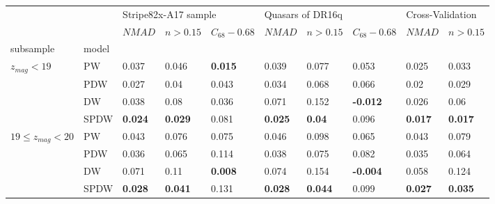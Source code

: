 \documentclass[fleqn,usenatbib]{mnras}
\begin{document}
\begin{table}
	\begin{tabular}{llllllllll}
            \hline
                                   &      & \multicolumn{3}{l}{Stripe82x-A17 sample} & \multicolumn{3}{l}{Quasars of DR16q} & \multicolumn{2}{l}{Cross-Validation} \\
                                   &      &               $NMAD$ &        $n>0.15$ &  $C_{68} - 0.68$ &           $NMAD$ &        $n>0.15$ &  $C_{68} - 0.68$ &           $NMAD$ &        $n>0.15$ \\
            subsample & model &                      &                 &                  &                  &                 &                  &                  &                 \\
            \hline
\hline
            $z_{mag} < 19$ & PW &                0.037 &           0.046 &   \textbf{0.015} &            0.039 &           0.077 &            0.053 &            0.025 &           0.033 \\
                                   & PDW &                0.027 &            0.04 &            0.043 &            0.034 &           0.068 &            0.066 &             0.02 &           0.029 \\
                                   & DW &                0.038 &            0.08 &            0.036 &            0.071 &           0.152 &  \textbf{-0.012} &            0.026 &            0.06 \\
                                   & SPDW &       \textbf{0.024} &  \textbf{0.029} &            0.081 &   \textbf{0.025} &   \textbf{0.04} &            0.096 &   \textbf{0.017} &  \textbf{0.017} \\
\hline
            $19 \leq z_{mag} < 20$ & PW &                0.043 &           0.076 &            0.075 &            0.046 &           0.098 &            0.065 &            0.043 &           0.079 \\
                                   & PDW &                0.036 &           0.065 &            0.114 &            0.038 &           0.075 &            0.082 &            0.035 &           0.064 \\
                                   & DW &                0.071 &            0.11 &   \textbf{0.008} &            0.074 &           0.154 &  \textbf{-0.004} &            0.058 &           0.124 \\
                                   & SPDW &       \textbf{0.028} &  \textbf{0.041} &            0.131 &   \textbf{0.028} &  \textbf{0.044} &            0.099 &   \textbf{0.027} &  \textbf{0.035} \\

\end{tabular}
\end{table}
\end{document}
